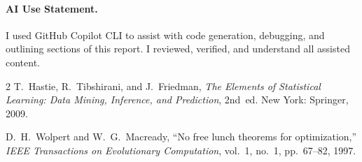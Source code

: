\documentclass[10pt,twocolumn]{article}
\begin{document}
\paragraph{AI Use Statement.} I used GitHub Copilot CLI to assist with code generation, debugging, and outlining sections of this report. I reviewed, verified, and understand all assisted content.


\begin{thebibliography}{2}
T.~Hastie, R.~Tibshirani, and J.~Friedman, \textit{The Elements of Statistical Learning: Data Mining, Inference, and Prediction}, 2nd~ed. New York: Springer, 2009.

D.~H.~Wolpert and W.~G.~Macready, ``No free lunch theorems for optimization,'' \textit{IEEE Transactions on Evolutionary Computation}, vol.~1, no.~1, pp.~67--82, 1997.
\end{thebibliography}
\end{document}
